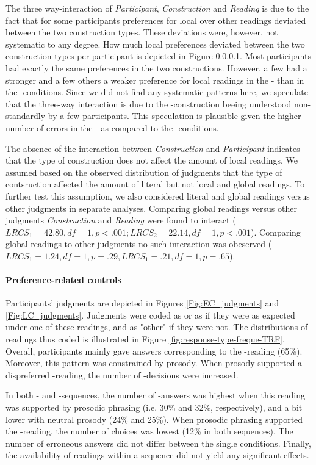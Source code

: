 \documentclass[fleqn,reqno,10pt,draft]{article}
\newcommand{\as}{\acro{as}}
\renewcommand{\es}{\acro{es}}
\newcommand{\lc}{\acro{lc}}
\newcommand{\ec}{\acro{ec}}
\begin{document}
The three way-interaction of {\it Participant}, {\it Construction} and
{\it Reading} is due to the fact that for some participants
preferences for local over other readings deviated between the two
construction types. These deviations were, however, not systematic to
any degree. How much local preferences deviated between the two
construction types per participant is depicted in Figure \ref{}. Most
participants had exactly the same preferences in the two
constructions. However, a few had a stronger and a few others a weaker
preference for local readings in the \es- than in the
\as-conditions. Since we did not find any systematic patterns
here, we speculate that the three-way interaction is due to the
\es-construction beeing understood non-standardly by a
few participants. This speculation is plausible given the higher
number of errors in the \es- as compared to the \as-conditions.

The absence of the interaction between {\it Construction} and {\it
  Participant} indicates that the type of construction does not affect
the amount of local readings. We assumed based on the observed
distribution of judgments that the type of contsruction affected the
amount of literal but not local and global readings. To further test
this assumption, we also considered literal and global readings versus
other judgments in separate analyses. Comparing global readings versus
other judgments {\it Construction} and {\it Reading} were found to
interact ($LRCS_1=42.80, df= 1, p<.001; LRCS_2=22.14, df= 1,
p<.001$). Comparing global readings to other judgments no such
interaction was obeserved ($LRCS_1=1.24, df= 1, p=.29, LRCS_1=.21, df=
1, p=.65$).


\paragraph{Preference-related controls}

Participants' judgments are depicted in Figures \ref{Fig:EC_judgments} and 
\ref{Fig:LC_judgments}. Judgments were coded as \ec or as \lc if they were as expected
under one of these readings, and as "other" if they were not. The distributions 
of readings thus coded is illustrated in Figure \ref{fig:response-type-freque-TRF}. 
Overall, participants mainly gave answers corresponding to the \lc-reading (65\%). 
Moreover, this pattern was constrained by prosody. When prosody 
supported a dispreferred \ec-reading, the number of \ec-decisions were increased. 

In both \lc- and \ec-sequences, the number of \ec-answers was highest when this reading
was supported by prosodic phrasing (i.e. 30\%  and 32\%, respectively), and a bit lower
with neutral prosody (24\%  and 25\%). When prosodic phrasing supported the \lc-reading,
the number of \ec choices was lowest (12\% in both sequences). The number 
of erroneous answers did not differ between the single conditions. Finally, the
availability of readings within a sequence did not yield any significant effects.
\end{document}
